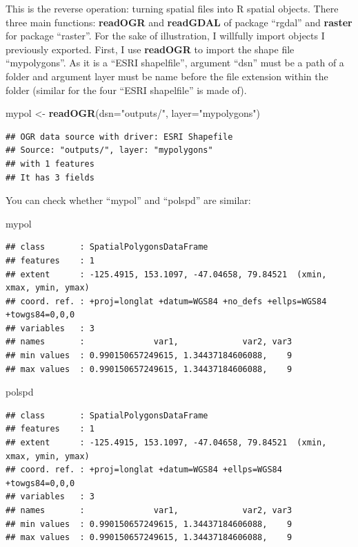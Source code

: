 \documentclass[]{report}
\newenvironment{Shaded}{\begin{snugshade}}{\end{snugshade}}
\newcommand{\KeywordTok}[1]{\textcolor[rgb]{0.13,0.29,0.53}{\textbf{{#1}}}}
\newcommand{\DataTypeTok}[1]{\textcolor[rgb]{0.13,0.29,0.53}{{#1}}}
\newcommand{\StringTok}[1]{\textcolor[rgb]{0.31,0.60,0.02}{{#1}}}
\newcommand{\NormalTok}[1]{{#1}}
\begin{document}
This is the reverse operation: turning spatial files into R spatial
objects. There three main functions: \textbf{readOGR} and
\textbf{readGDAL} of package ``rgdal'' and \textbf{raster} for package
``raster''. For the sake of illustration, I willfully import objects I
previously exported. First, I use \textbf{readOGR} to import the shape
file ``mypolygons''. As it is a ``ESRI shapelfile'', argument ``dsn''
must be a path of a folder and argument layer must be name before the
file extension within the folder (similar for the four ``ESRI
shapelfile'' is made of).

\begin{Shaded}
\begin{Highlighting}[]
\NormalTok{mypol <-}\StringTok{ }\KeywordTok{readOGR}\NormalTok{(}\DataTypeTok{dsn=}\StringTok{"outputs/"}\NormalTok{, }\DataTypeTok{layer=}\StringTok{"mypolygons"}\NormalTok{)}
\end{Highlighting}
\end{Shaded}

\begin{verbatim}
## OGR data source with driver: ESRI Shapefile 
## Source: "outputs/", layer: "mypolygons"
## with 1 features
## It has 3 fields
\end{verbatim}

You can check whether ``mypol'' and ``polspd'' are similar:

\begin{Shaded}
\begin{Highlighting}[]
\NormalTok{mypol}
\end{Highlighting}
\end{Shaded}

\begin{verbatim}
## class       : SpatialPolygonsDataFrame 
## features    : 1 
## extent      : -125.4915, 153.1097, -47.04658, 79.84521  (xmin, xmax, ymin, ymax)
## coord. ref. : +proj=longlat +datum=WGS84 +no_defs +ellps=WGS84 +towgs84=0,0,0 
## variables   : 3
## names       :              var1,             var2, var3 
## min values  : 0.990150657249615, 1.34437184606088,    9 
## max values  : 0.990150657249615, 1.34437184606088,    9
\end{verbatim}

\begin{Shaded}
\begin{Highlighting}[]
\NormalTok{polspd}
\end{Highlighting}
\end{Shaded}

\begin{verbatim}
## class       : SpatialPolygonsDataFrame 
## features    : 1 
## extent      : -125.4915, 153.1097, -47.04658, 79.84521  (xmin, xmax, ymin, ymax)
## coord. ref. : +proj=longlat +datum=WGS84 +ellps=WGS84 +towgs84=0,0,0 
## variables   : 3
## names       :              var1,             var2, var3 
## min values  : 0.990150657249615, 1.34437184606088,    9 
## max values  : 0.990150657249615, 1.34437184606088,    9
\end{verbatim}
\end{document}
